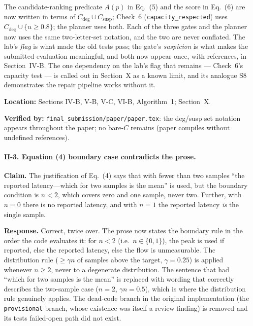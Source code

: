 \documentclass[11pt,a4paper]{article}
\begin{document}
The candidate-ranking predicate $A(p)$ in Eq.~(5) and the score in Eq.~(6)
are now written in terms of $C_{\mathrm{deg}} \cup C_{\mathrm{susp}}$; Check~6
(\texttt{capacity\_respected}) uses $C_{\mathrm{deg}} \cup \{u \ge 0.8\}$;
the planner uses both. Each of the three gates and the planner now uses the
same two-letter-set notation, and the two are never conflated. The lab's
\emph{flag} is what made the old tests pass; the gate's \emph{suspicion} is
what makes the submitted evaluation meaningful, and both now appear once, with
references, in Section~IV-B. The one dependency on the lab's flag that remains
--- Check~6's capacity test --- is called out in Section~X as a known limit,
and its analogue S8 demonstrates the repair pipeline works without it.

\textbf{Location:} Sections IV-B, V-B, V-C, VI-B, Algorithm~1; Section~X.

\textbf{Verified by:} \texttt{final\_submission/paper/paper.tex}:
the deg/susp set notation appears throughout the paper; no bare-$C$ remains (paper compiles without undefined references).

\paragraph{II-3. Equation (4) boundary case contradicts the prose.}

\textbf{Claim.} The justification of Eq.~(4) says that with fewer than two
samples ``the reported latency---which for two samples is the mean'' is used,
but the boundary condition is $n < 2$, which covers zero and one sample, never
two. Further, with $n = 0$ there is no reported latency, and with $n = 1$ the
reported latency \emph{is} the single sample.

\textbf{Response.} Correct, twice over. The prose now states the boundary rule
in the order the code evaluates it: for $n < 2$ (i.e.\ $n \in \{0, 1\}$), the
peak is used if reported, else the reported latency, else the flow is
unmeasurable. The distribution rule ($\ge \gamma n$ of samples above the
target, $\gamma = 0.25$) is applied whenever $n \ge 2$, never to a degenerate
distribution. The sentence that had ``which for two samples is the mean'' is
replaced with wording that correctly describes the two-sample case ($n = 2$,
$\gamma n = 0.5$), which is where the distribution rule genuinely applies.
The dead-code branch in the original implementation (the \texttt{provisional}
branch, whose existence was itself a review finding) is removed and its tests
failed-open path did not exist.
\end{document}
